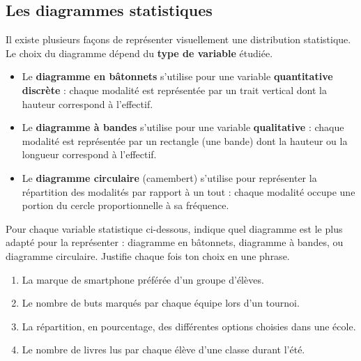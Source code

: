 \documentclass[../../syllabus_1.tex]{subfiles}
\begin{document}
\subsection{Les diagrammes statistiques}

Il existe plusieurs façons de représenter visuellement une distribution statistique. Le choix du diagramme dépend du \textbf{type de variable} étudiée.
\begin{itemize}
    \item Le \textbf{diagramme en bâtonnets} s'utilise pour une variable \textbf{quantitative discrète} : chaque modalité est représentée par un trait vertical dont la hauteur correspond à l'effectif.
    \item Le \textbf{diagramme à bandes} s'utilise pour une variable \textbf{qualitative} : chaque modalité est représentée par un rectangle (une bande) dont la hauteur ou la longueur correspond à l'effectif.
    \item Le \textbf{diagramme circulaire} (camembert) s'utilise pour représenter la répartition des modalités par rapport à un tout : chaque modalité occupe une portion du cercle proportionnelle à sa fréquence.
\end{itemize}
\vspace{0.8cm}

\newpage
\begin{exercise}
    Pour chaque variable statistique ci-dessous, indique quel diagramme est le plus adapté pour la représenter : diagramme en bâtonnets, diagramme à bandes, ou diagramme circulaire. Justifie chaque fois ton choix en une phrase.
    \begin{enumerate}[itemsep=1.2cm]
        \item La marque de smartphone préférée d'un groupe d'élèves.
        \item Le nombre de buts marqués par chaque équipe lors d'un tournoi.
        \item La répartition, en pourcentage, des différentes options choisies dans une école.
        \item Le nombre de livres lus par chaque élève d'une classe durant l'été.
    \end{enumerate}
\end{exercise}
\vspace{0.8cm}
\end{document}
